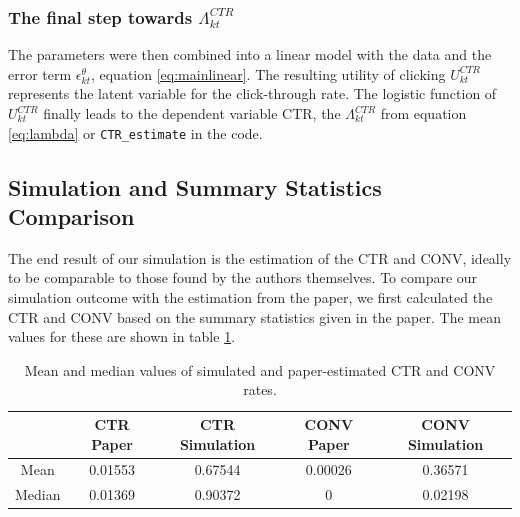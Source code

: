 \newpage
\subsubsection{The final step towards $\Lambda^{CTR}_{kt}$}
The parameters were then combined into a linear model with the data and the error term $\epsilon^{\theta}_{kt}$, equation \ref{eq:mainlinear}. The resulting utility of clicking $U^{CTR}_{kt}$ represents the latent variable for the click-through rate. The logistic function of $U^{CTR}_{kt}$ finally leads to the dependent variable CTR, the $\Lambda^{CTR}_{kt}$ from equation \ref{eq:lambda} or \texttt{CTR\_estimate} in the code.



\subsection{Simulation and Summary Statistics Comparison}
The end result of our simulation is the estimation of the CTR and CONV, ideally to be comparable to those found by the authors themselves. To compare our simulation outcome with the estimation from the paper, we first calculated the CTR and CONV based on the summary statistics given in the paper. The mean values for these are shown in table \ref{table:ctr-conv-vs}.

\begin{center}
\begin{table}[h!]
 \begin{tabular}{|c|c|c|c|c|}
 \hline
  & CTR Paper & CTR Simulation & CONV Paper & CONV Simulation \\
 \hline
 Mean & 0.01553 & 0.67544 & 0.00026 & 0.36571\\ 
 \hline
 Median & 0.01369 & 0.90372 & 0 & 0.02198 \\
 \hline
\end{tabular}
\caption{Mean and median values of simulated and paper-estimated CTR and CONV rates.}
\label{table:ctr-conv-vs}
\end{table}
\end{center}


